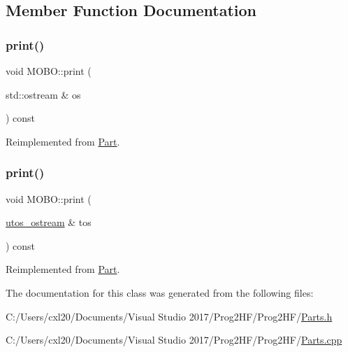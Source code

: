\subsection{Member Function Documentation}
\mbox{\label{class_m_o_b_o_a3241f425030e01d5b7a192c23af2dbda}} 
\subsubsection{\texorpdfstring{print()}{print()}\hspace{0.1cm}{\footnotesize\ttfamily [1/2]}}
{\footnotesize\ttfamily void M\+O\+B\+O\+::print (\begin{DoxyParamCaption}\item[{std\+::ostream \&}]{os }\end{DoxyParamCaption}) const\hspace{0.3cm}{\ttfamily [virtual]}}



Reimplemented from \mbox{\hyperlink{class_part_a4fa402b8e8fd4236ff773a7697ab2bc3}{Part}}.

\mbox{\label{class_m_o_b_o_a4c78cec3a2a3e4d4480855622f50bd06}} 
\subsubsection{\texorpdfstring{print()}{print()}\hspace{0.1cm}{\footnotesize\ttfamily [2/2]}}
{\footnotesize\ttfamily void M\+O\+B\+O\+::print (\begin{DoxyParamCaption}\item[{\mbox{\hyperlink{structutos__ostream}{utos\+\_\+ostream}} \&}]{tos }\end{DoxyParamCaption}) const\hspace{0.3cm}{\ttfamily [virtual]}}



Reimplemented from \mbox{\hyperlink{class_part_a9ecabe44ba3415badf82c6a23617a41e}{Part}}.



The documentation for this class was generated from the following files\+:\begin{DoxyCompactItemize}
\item 
C\+:/\+Users/cxl20/\+Documents/\+Visual Studio 2017/\+Prog2\+H\+F/\+Prog2\+H\+F/\mbox{\hyperlink{_parts_8h}{Parts.\+h}}\item 
C\+:/\+Users/cxl20/\+Documents/\+Visual Studio 2017/\+Prog2\+H\+F/\+Prog2\+H\+F/\mbox{\hyperlink{_parts_8cpp}{Parts.\+cpp}}\end{DoxyCompactItemize}
